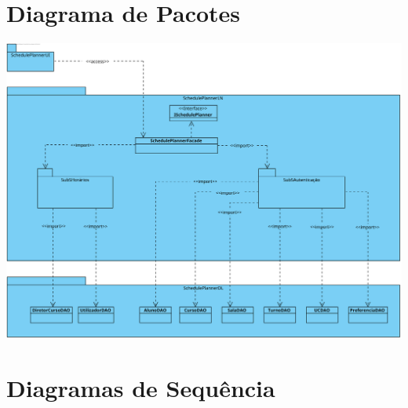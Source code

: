 \documentclass[a4paper,12pt]{scrreprt}
\begin{document}


\chapter{Diagrama de Pacotes}
\vspace{1cm}

\begin{minipage}{\textwidth}
    \centering
    \includegraphics[width=1\textwidth]{images/packages-diagram.png}
    \label{fig:7-1-diagrama_de_pacotes}
\end{minipage}



\chapter{Diagramas de Sequência}
\vspace{1cm}
\end{document}
